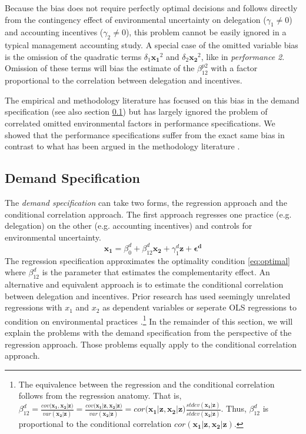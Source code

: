 \documentclass[12pt]{article}
\begin{document}
Because the bias does not require perfectly optimal decisions and follows directly from the contingency effect of environmental uncertainty on delegation ($\gamma_1 \neq 0$) and accounting incentives ($\gamma_2 \neq 0$), this problem cannot be easily ignored in a typical management accounting study. A special case of the omitted variable bias is the omission of the quadratic terms $\delta_1 \mathbf{x_1}^2$ and $\delta_2 \mathbf{x_2}^2$, like in \emph{performance 2}. Omission of these terms will bias the estimate of the $\beta^{p2}_{12}$ with a factor proportional to the correlation between delegation and incentives.

The empirical and methodology literature has focused on this bias in the demand specification (see also section \ref{demand-specification}) but has largely ignored the problem of correlated omitted environmental factors in performance specifications. We showed that the performance specifications suffer from the exact same bias in contrast to what has been argued in the methodology literature \citep{carree_note_2011}. 

\subsection{Demand Specification}\label{demand-specification}

The \emph{demand specification} can take two forms, the regression approach and the conditional correlation approach. The first approach regresses one practice (e.g. delegation) on the other (e.g. accounting incentives) and controls for environmental uncertainty.
\begin{equation*} 
\mathbf{x_1} = \beta_0^d + \beta_{12}^d \mathbf{x_2} 
        + \gamma_{1}^d \mathbf{z}
        + \mathbf{\epsilon^d}
\end{equation*}
The regression specification approximates the optimality condition \eqref{eq:optimal} where \(\beta^d_{12}\) is the parameter that estimates the complementarity effect. An alternative and equivalent approach is to estimate the conditional correlation between delegation and incentives. Prior research has used seemingly unrelated regressions with $x_1$ and $x_2$ as dependent variables or seperate OLS regressions to condition on environmental practices \citep{indjejikian_accounting_2012, matejka_balancing_2017}.\footnote{The equivalence between the regression and the conditional correlation follows from the regression anatomy. That is, $\beta^d_{12}=\frac{cov(\mathbf{x_1}, \mathbf{x_2|z)}}{var (\mathbf{x_2|z})}=\frac{cov(\mathbf{x_1|z}, \mathbf{x_2|z)}}{var (\mathbf{x_2|z})}=cor(\mathbf{x_1|z}, \mathbf{x_2|z)}\frac{stdev(\mathbf{x_1|z})}{stdev (\mathbf{x_2|z})}$. Thus, $\beta^d_{12}$ is proportional to the conditional correlation $cor(\mathbf{x_1|z}, \mathbf{x_2|z})$.} In the remainder of this section, we will explain the problems with the demand specification from the perspective of the regression approach. Those problems equally apply to the conditional correlation approach.  
\end{document}
